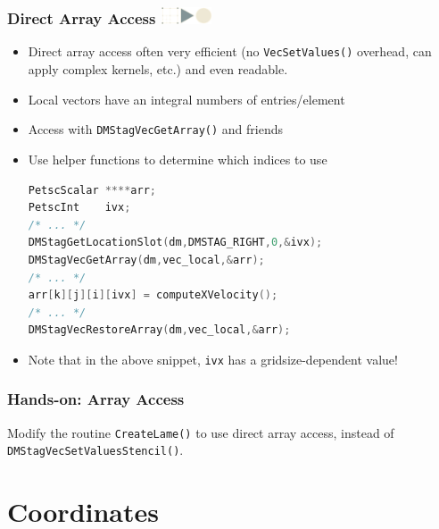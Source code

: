 \documentclass{beamer}
\newcommand\frametitlelogo[1]{\frametitle{#1\hspace{0pt plus 1 filll} \includegraphics[width=42pt]{logo_slides}}}
\begin{document}
\begin{frame}[fragile]
\frametitlelogo{Direct Array Access}
\begin{itemize}
  \item Direct array access often very efficient (no \lstinline{VecSetValues()} overhead, can apply complex kernels, etc.) and even readable.
\item Local vectors have an integral numbers of entries/element
\item Access with \lstinline{DMStagVecGetArray()} and friends
\item Use helper functions to determine which indices to use
  \begin{lstlisting}[language=C,basicstyle=\scriptsize\ttfamily]
PetscScalar ****arr;
PetscInt    ivx;
/* ... */
DMStagGetLocationSlot(dm,DMSTAG_RIGHT,0,&ivx);
DMStagVecGetArray(dm,vec_local,&arr);
/* ... */
arr[k][j][i][ivx] = computeXVelocity();
/* ... */
DMStagVecRestoreArray(dm,vec_local,&arr);
\end{lstlisting}
\item Note that in the above snippet, \lstinline{ivx} has a gridsize-dependent value!
\end{itemize}
\end{frame}

\begin{frame}[fragile]
  \frametitle{Hands-on: Array Access}
  Modify the routine \lstinline{CreateLame()} to use direct array access, instead
  of \lstinline{DMStagVecSetValuesStencil()}.
\end{frame}

\section{Coordinates}
\end{document}
